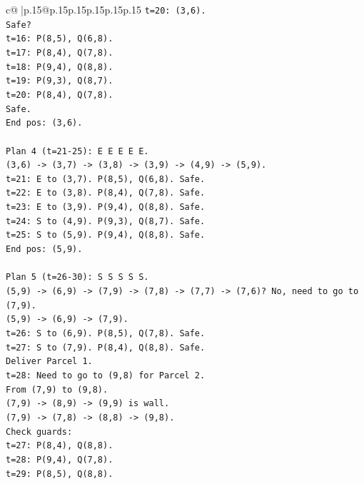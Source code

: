 \documentclass{article}
\begin{document}
{\begin{supertabular}{c@{$\;$}|p{.15\linewidth}@{}p{.15\linewidth}p{.15\linewidth}p{.15\linewidth}p{.15\linewidth}p{.15\linewidth}}
{{{\texttt{t=20: (3,6).} \\
\texttt{Safe?} \\
\texttt{t=16: P(8,5), Q(6,8).} \\
\texttt{t=17: P(8,4), Q(7,8).} \\
\texttt{t=18: P(9,4), Q(8,8).} \\
\texttt{t=19: P(9,3), Q(8,7).} \\
\texttt{t=20: P(8,4), Q(7,8).} \\
\texttt{Safe.} \\
\texttt{End pos: (3,6).} \\
\\ 
\texttt{Plan 4 (t=21{-}25): E E E E E.} \\
\texttt{(3,6) {-}> (3,7) {-}> (3,8) {-}> (3,9) {-}> (4,9) {-}> (5,9).} \\
\texttt{t=21: E to (3,7). P(8,5), Q(6,8). Safe.} \\
\texttt{t=22: E to (3,8). P(8,4), Q(7,8). Safe.} \\
\texttt{t=23: E to (3,9). P(9,4), Q(8,8). Safe.} \\
\texttt{t=24: S to (4,9). P(9,3), Q(8,7). Safe.} \\
\texttt{t=25: S to (5,9). P(9,4), Q(8,8). Safe.} \\
\texttt{End pos: (5,9).} \\
\\ 
\texttt{Plan 5 (t=26{-}30): S S S S S.} \\
\texttt{(5,9) {-}> (6,9) {-}> (7,9) {-}> (7,8) {-}> (7,7) {-}> (7,6)? No, need to go to (7,9).} \\
\texttt{(5,9) {-}> (6,9) {-}> (7,9).} \\
\texttt{t=26: S to (6,9). P(8,5), Q(7,8). Safe.} \\
\texttt{t=27: S to (7,9). P(8,4), Q(8,8). Safe.} \\
\texttt{Deliver Parcel 1.} \\
\texttt{t=28: Need to go to (9,8) for Parcel 2.} \\
\texttt{From (7,9) to (9,8).} \\
\texttt{(7,9) {-}> (8,9) {-}> (9,9) is wall.} \\
\texttt{(7,9) {-}> (7,8) {-}> (8,8) {-}> (9,8).} \\
\texttt{Check guards:} \\
\texttt{t=27: P(8,4), Q(8,8).} \\
\texttt{t=28: P(9,4), Q(7,8).} \\
\texttt{t=29: P(8,5), Q(8,8).} \\
}}}
\end{supertabular}}
\end{document}
